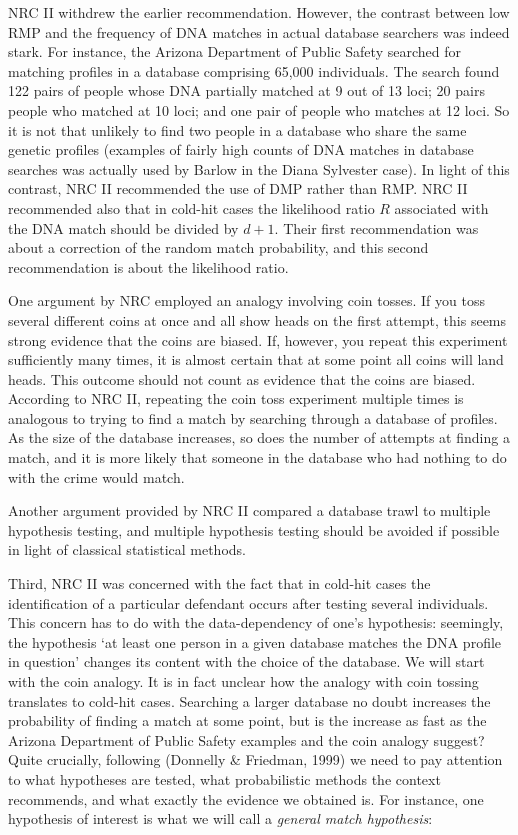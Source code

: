 \documentclass[10pt,dvipsnames,enabledeprecatedfontcommands]{scrartcl}
\begin{document}
NRC II withdrew the earlier recommendation. However, the contrast
between low RMP and the frequency of DNA matches in actual database
searchers was indeed stark. For instance, the Arizona Department of
Public Safety searched for matching profiles in a database comprising
65,000 individuals. The search found 122 pairs of people whose DNA
partially matched at 9 out of 13 loci; 20 pairs people who matched at 10
loci; and one pair of people who matches at 12 loci. So it is not that
unlikely to find two people in a database who share the same genetic
profiles (examples of fairly high counts of DNA matches in database
searches was actually used by Barlow in the Diana Sylvester case). In
light of this contrast, NRC II recommended the use of DMP rather than
RMP. NRC II recommended also that in cold-hit cases the likelihood ratio
\(R\) associated with the DNA match should be divided by \(d+1\). Their
first recommendation was about a correction of the random match
probability, and this second recommendation is about the likelihood
ratio.

One argument by NRC employed an analogy involving coin tosses. If you
toss several different coins at once and all show heads on the first
attempt, this seems strong evidence that the coins are biased. If,
however, you repeat this experiment sufficiently many times, it is
almost certain that at some point all coins will land heads. This
outcome should not count as evidence that the coins are biased.
According to NRC II, repeating the coin toss experiment multiple times
is analogous to trying to find a match by searching through a database
of profiles. As the size of the database increases, so does the number
of attempts at finding a match, and it is more likely that someone in
the database who had nothing to do with the crime would match.

Another argument provided by NRC II compared a database trawl to
multiple hypothesis testing, and multiple hypothesis testing should be
avoided if possible in light of classical statistical methods.

Third, NRC II was concerned with the fact that in cold-hit cases the
identification of a particular defendant occurs after testing several
individuals. This concern has to do with the data-dependency of one's
hypothesis: seemingly, the hypothesis `at least one person in a given
database matches the DNA profile in question' changes its content with
the choice of the database. We will start with the coin analogy. It is
in fact unclear how the analogy with coin tossing translates to cold-hit
cases. Searching a larger database no doubt increases the probability of
finding a match at some point, but is the increase as fast as the
Arizona Department of Public Safety examples and the coin analogy
suggest? Quite crucially, following (Donnelly \& Friedman, 1999) we need
to pay attention to what hypotheses are tested, what probabilistic
methods the context recommends, and what exactly the evidence we
obtained is. For instance, one hypothesis of interest is what we will
call a \emph{general match hypothesis}: \vspace{1mm}
\end{document}
